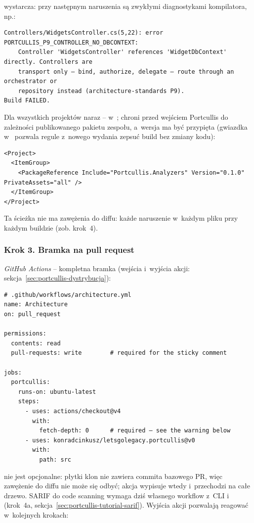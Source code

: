 wystarcza: przy następnym  naruszenia są zwykłymi diagnostykami
kompilatora, np.:

\begin{lstlisting}
Controllers/WidgetsController.cs(5,22): error PORTCULLIS_P9_CONTROLLER_NO_DBCONTEXT:
    Controller 'WidgetsController' references 'WidgetDbContext' directly. Controllers are
    transport only — bind, authorize, delegate — route through an orchestrator or
    repository instead (architecture-standards P9).
Build FAILED.
\end{lstlisting}

Dla wszystkich projektów naraz -- w~; 
chroni przed wejściem Portcullis do zależności publikowanego pakietu zespołu, a~wersja ma być
przypięta (gwiazdka w~ pozwala regule z~nowego wydania zepsuć build bez
zmiany kodu):

\begin{lstlisting}
<Project>
  <ItemGroup>
    <PackageReference Include="Portcullis.Analyzers" Version="0.1.0" PrivateAssets="all" />
  </ItemGroup>
</Project>
\end{lstlisting}

Ta ścieżka nie ma zawężenia do diffu: każde naruszenie w~każdym pliku przy każdym buildzie
(zob. krok~4).

\subsubsection{Krok 3. Bramka na pull request}

\emph{GitHub Actions} -- kompletna bramka
(wejścia i~wyjścia akcji: sekcja~\ref{sec:portcullis-dystrybucja}):

\begin{lstlisting}
# .github/workflows/architecture.yml
name: Architecture
on: pull_request

permissions:
  contents: read
  pull-requests: write        # required for the sticky comment

jobs:
  portcullis:
    runs-on: ubuntu-latest
    steps:
      - uses: actions/checkout@v4
        with:
          fetch-depth: 0      # required — see the warning below
      - uses: konradcinkusz/letsgolegacy.portcullis@v0
        with:
          path: src
\end{lstlisting}

 nie jest opcjonalne: płytki klon nie zawiera commita bazowego PR,
więc zawężenie do diffu nie może się odbyć; akcja wypisuje wtedy 
i~przechodzi na całe drzewo. SARIF do code scanning wymaga dziś własnego workflow z~CLI
i~ (krok~4a, sekcja~\ref{sec:portcullis-tutorial-sarif}). Wyjścia
akcji pozwalają reagować w~kolejnych krokach:

